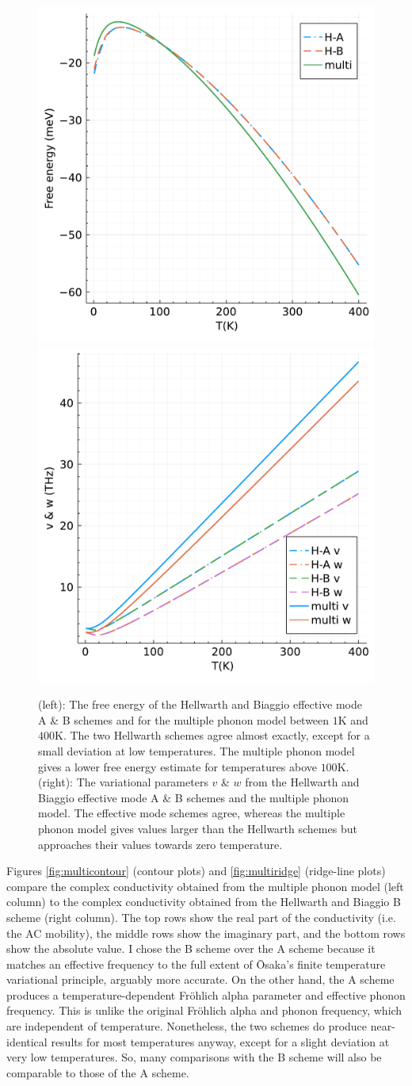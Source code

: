 \begin{figure}[t]
    \centering
    \includegraphics[width=.49\textwidth]{figures/free_energy_temp.pdf}
    \includegraphics[width=.49\textwidth]{figures/vw_temp.pdf}
    \caption{(left): The free energy of the Hellwarth and Biaggio effective mode A \& B schemes and for the multiple phonon model between $1$K and $400$K. The two Hellwarth schemes agree almost exactly, except for a small deviation at low temperatures. The multiple phonon model gives a lower free energy estimate for temperatures above $100$K. (right): The variational parameters $v$ \& $w$ from the Hellwarth and Biaggio effective mode A \& B schemes and the multiple phonon model. The effective mode schemes agree, whereas the multiple phonon model gives values larger than the Hellwarth schemes but approaches their values towards zero temperature.}
    \label{fig:multitheory}
\end{figure}

Figures \ref{fig:multicontour} (contour plots) and \ref{fig:multiridge} (ridge-line plots) compare the complex conductivity obtained from the multiple phonon model (left column) to the complex conductivity obtained from the Hellwarth and Biaggio B scheme (right column). The top rows show the real part of the conductivity (i.e. the AC mobility), the middle rows show the imaginary part, and the bottom rows show the absolute value. I chose the B scheme over the A scheme because it matches an effective frequency to the full extent of \=Osaka's finite temperature variational principle, arguably more accurate. On the other hand, the A scheme produces a temperature-dependent Fr\"ohlich alpha parameter and effective phonon frequency. This is unlike the original Fr\"ohlich alpha and phonon frequency, which are independent of temperature. Nonetheless, the two schemes do produce near-identical results for most temperatures anyway, except for a slight deviation at very low temperatures. So, many comparisons with the B scheme will also be comparable to those of the A scheme. 


